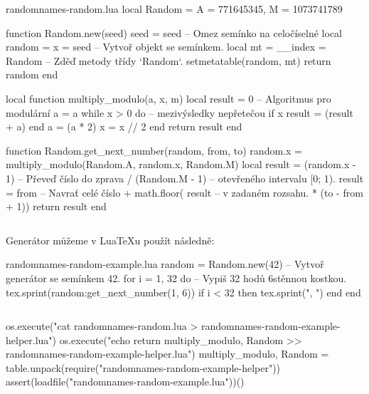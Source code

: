 \documentclass{csbulletin}
\newcommand\myinputminted[3][]{%
  \inputminted[#1]{#2}{#3}%
}
\newcommand\myinputminted[3][]{%
  \inputminted[#1]{#2}{code-placeholder.#2}%
}
\begin{document}
\begin{filecontents}{randomnames-random.lua}
local Random = { A = 771645345, M = 1073741789 }

function Random.new(seed)
  seed = seed                      -- Omez semínko na celočíselné
  local random = { x = seed }      -- Vytvoř objekt se semínkem.
  local mt = { __index = Random }  -- Zděď metody třídy `Random`.
  setmetatable(random, mt)
  return random
end

local function multiply_modulo(a, x, m)
  local result = 0                 -- Algoritmus pro modulární
  a = a %
  while x > 0 do                   -- mezivýsledky nepřetečou
    if x %
      result = (result + a) %
    end
    a = (a * 2) %
    x = x // 2
  end
  return result %
end

function Random.get_next_number(random, from, to)
  random.x = multiply_modulo(Random.A, random.x, Random.M)
  local result = (random.x - 1)    -- Převeď číslo do zprava
               / (Random.M - 1)    -- otevřeného intervalu [0; 1).
  result = from                    -- Navrať celé číslo
         + math.floor( result      -- v zadaném rozsahu.
                     * (to - from + 1))
  return result
end

\end{filecontents}
\myinputminted{lua}{randomnames-random.lua}

Generátor můžeme v Lua\TeX u použít následně:

\begin{filecontents}{randomnames-random-example.lua}
random = Random.new(42)        -- Vytvoř generátor se semínkem 42.
for i = 1, 32 do               -- Vypiš 32 hodů 6stěnnou kostkou.
  tex.sprint(random:get_next_number(1, 6))
  if i < 32 then tex.sprint(", ") end
end
\end{filecontents}
\myinputminted[linenos=false]{lua}{randomnames-random-example.lua}

\noindent
\begin{luacode*}
os.execute("cat randomnames-random.lua > randomnames-random-example-helper.lua")
os.execute("echo return {multiply_modulo, Random} >> randomnames-random-example-helper.lua")
multiply_modulo, Random = table.unpack(require("randomnames-random-example-helper"))
assert(loadfile("randomnames-random-example.lua"))()
\end{luacode*}
\end{document}
